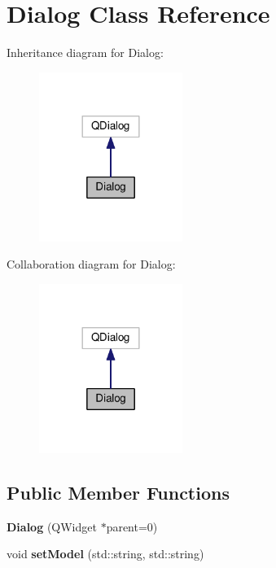 \section{Dialog Class Reference}
\label{class_dialog}


Inheritance diagram for Dialog\+:\nopagebreak
\begin{figure}[H]
\begin{center}
\leavevmode
\includegraphics[width=132pt]{class_dialog__inherit__graph}
\end{center}
\end{figure}


Collaboration diagram for Dialog\+:\nopagebreak
\begin{figure}[H]
\begin{center}
\leavevmode
\includegraphics[width=132pt]{class_dialog__coll__graph}
\end{center}
\end{figure}
\subsection*{Public Member Functions}
\begin{DoxyCompactItemize}
\item 
{\bfseries Dialog} (Q\+Widget $\ast$parent=0)\label{class_dialog_acfa2063f9f962d394c6a645b6e7e08d8}

\item 
void {\bfseries set\+Model} (std\+::string, std\+::string)\label{class_dialog_a7c7a7d1d9e11357a21401d321d8173a8}

\end{DoxyCompactItemize}
